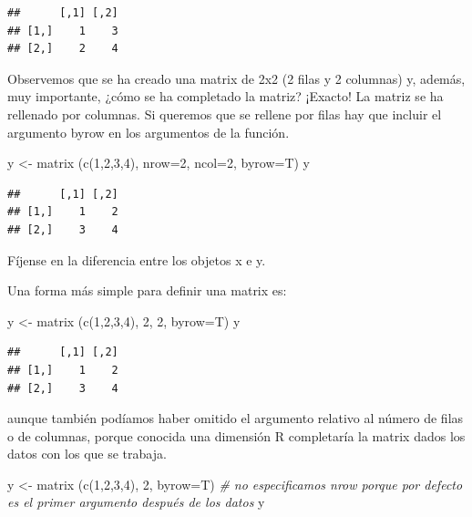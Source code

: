 \documentclass[
]{book}
\newenvironment{Shaded}{\begin{snugshade}}{\end{snugshade}}
\newcommand{\AttributeTok}[1]{\textcolor[rgb]{0.77,0.63,0.00}{#1}}
\newcommand{\CommentTok}[1]{\textcolor[rgb]{0.56,0.35,0.01}{\textit{#1}}}
\newcommand{\DecValTok}[1]{\textcolor[rgb]{0.00,0.00,0.81}{#1}}
\newcommand{\FunctionTok}[1]{\textcolor[rgb]{0.00,0.00,0.00}{#1}}
\newcommand{\NormalTok}[1]{#1}
\newcommand{\OtherTok}[1]{\textcolor[rgb]{0.56,0.35,0.01}{#1}}
\begin{document}
\begin{verbatim}
##      [,1] [,2]
## [1,]    1    3
## [2,]    2    4
\end{verbatim}

Observemos que se ha creado una matrix de 2x2 (2 filas y 2 columnas) y, además, muy importante, ¿cómo se ha completado la matriz? ¡Exacto! La matriz se ha rellenado por columnas. Si queremos que se rellene por filas hay que incluir el argumento byrow en los argumentos de la función.

\begin{Shaded}
\begin{Highlighting}[]
\NormalTok{y }\OtherTok{\textless{}{-}} \FunctionTok{matrix}\NormalTok{ (}\FunctionTok{c}\NormalTok{(}\DecValTok{1}\NormalTok{,}\DecValTok{2}\NormalTok{,}\DecValTok{3}\NormalTok{,}\DecValTok{4}\NormalTok{), }\AttributeTok{nrow=}\DecValTok{2}\NormalTok{, }\AttributeTok{ncol=}\DecValTok{2}\NormalTok{, }\AttributeTok{byrow=}\NormalTok{T)}
\NormalTok{y}
\end{Highlighting}
\end{Shaded}

\begin{verbatim}
##      [,1] [,2]
## [1,]    1    2
## [2,]    3    4
\end{verbatim}

Fíjense en la diferencia entre los objetos x e y.

Una forma más simple para definir una matrix es:

\begin{Shaded}
\begin{Highlighting}[]
\NormalTok{y }\OtherTok{\textless{}{-}} \FunctionTok{matrix}\NormalTok{ (}\FunctionTok{c}\NormalTok{(}\DecValTok{1}\NormalTok{,}\DecValTok{2}\NormalTok{,}\DecValTok{3}\NormalTok{,}\DecValTok{4}\NormalTok{), }\DecValTok{2}\NormalTok{, }\DecValTok{2}\NormalTok{, }\AttributeTok{byrow=}\NormalTok{T)}
\NormalTok{y}
\end{Highlighting}
\end{Shaded}

\begin{verbatim}
##      [,1] [,2]
## [1,]    1    2
## [2,]    3    4
\end{verbatim}

aunque también podíamos haber omitido el argumento relativo al número de filas o de columnas, porque conocida una dimensión R completaría la matrix dados los datos con los que se trabaja.

\begin{Shaded}
\begin{Highlighting}[]
\NormalTok{y }\OtherTok{\textless{}{-}} \FunctionTok{matrix}\NormalTok{ (}\FunctionTok{c}\NormalTok{(}\DecValTok{1}\NormalTok{,}\DecValTok{2}\NormalTok{,}\DecValTok{3}\NormalTok{,}\DecValTok{4}\NormalTok{), }\DecValTok{2}\NormalTok{, }\AttributeTok{byrow=}\NormalTok{T)  }\CommentTok{\# no especificamos nrow porque por defecto es el primer argumento después de los datos}
\NormalTok{y}
\end{Highlighting}
\end{Shaded}
\end{document}
